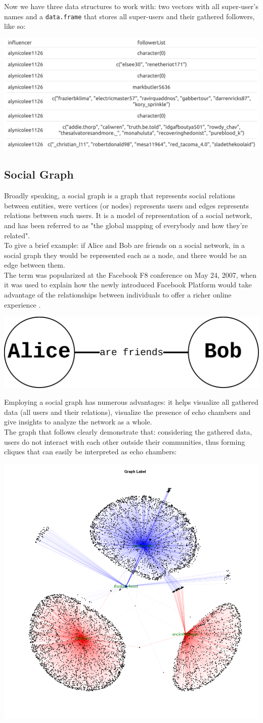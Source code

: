Now we have three data structures to work with: two vectors with all super-user's names and a \verb+data.frame+ that stores all super-users and their gathered followers, like so: 

\aCapo{}
\includegraphics[width = .48\textwidth]{images/total_table_p23.png}

\subsection{Social Graph}
Broadly speaking, a social graph is a graph that represents social relations between entities, were vertices (or nodes) represents users and edges represents relations between such users. It is a model of representation of a social network, and has been referred to as "the global mapping of everybody and how they're related".\\ 
To give a brief example: if Alice and Bob are friends on a social network, in a social graph they would be represented each as a node, and there would be an edge between them.\\
The term was popularized at the Facebook F8 conference on May 24, 2007, when it was used to explain how the newly introduced Facebook Platform would take advantage of the relationships between individuals to offer a richer online experience \cite{wikiSAN}.

\aCapo{}
\includegraphics[width = .5\textwidth]{images/alice_bob_san.png}

Employing a social graph has numerous advantages: it helps visualize all gathered data (all users and their relations), visualize the presence of echo chambers and give insights to analyze the network as a whole. \\
The graph that follows clearly demonstrate that: considering the gathered data, users do not interact with each other outside their communities, thus forming cliques that can easily be interpreted as echo chambers:

\aCapo{}
\includegraphics[width = .5\textwidth]{images/mockUP_san.png}

